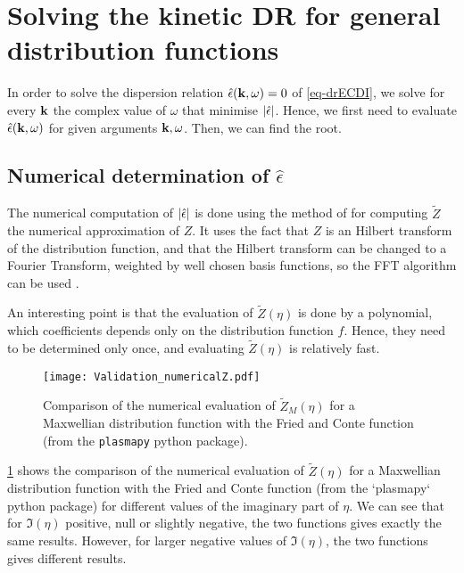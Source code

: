 
\section{Solving the kinetic \ac{DR} for general distribution functions}
  \label{sec-DR-solver}
  \renewcommand\rightmark{\expandafter\MakeUppercase{Solver for the general DR}}


  In order to solve the dispersion relation $\hat\epsilon({\mathbf k}, \omega) = 0$ of \cref{eq-drECDI}, we solve for every ${\mathbf k}$ the complex value of $\omega$ that minimise $\lvert\hat\epsilon\rvert$.
  Hence, we first need to evaluate $\hat\epsilon({\mathbf k}, \omega)$ for given arguments ${\mathbf k}, \omega$.
  Then, we can find the root.
  
  \subsection{Numerical determination of $\hat\epsilon$} \label{subsec-numepsilon}
  
  The numerical computation of $\lvert\hat\epsilon\rvert$ is done using the method of \citet{xie2013} for computing $\tilde{Z}$ the numerical approximation of $Z$. 
  It uses the fact that $Z$ is an Hilbert transform of the distribution function, and that the Hilbert transform can be changed to a Fourier Transform, weighted by well chosen basis functions, so the \ac{FFT} algorithm can be used \citep{weideman1995}.
  
  An interesting point is that the evaluation of $\tilde{Z}(\eta)$ is done by a polynomial, which coefficients depends only on the distribution function $f$. 
  Hence, they need to be determined only once, and evaluating $\tilde{Z}(\eta)$ is relatively fast.
  
  \begin{figure}[hbtp]
    \centering
    \texttt{[image: Validation\_numericalZ.pdf]}
    \caption{Comparison of the numerical evaluation of $\tilde{Z}_M(\eta)$ for a Maxwellian distribution function with the Fried and Conte function (from the \texttt{plasmapy} python package).  }
    \label{fig-numZ}
  \end{figure}
  \cref{fig-numZ} shows the comparison of the numerical evaluation of $\tilde{Z}(\eta)$ for a Maxwellian distribution function with the Fried and Conte function (from the `plasmapy` python package) for different values of the imaginary part of $\eta$.
  We can see that for $\Im(\eta)$ positive, null or slightly negative, the two functions gives exactly the same results.
  However, for larger negative values of $\Im(\eta)$, the two functions gives different results.
  
